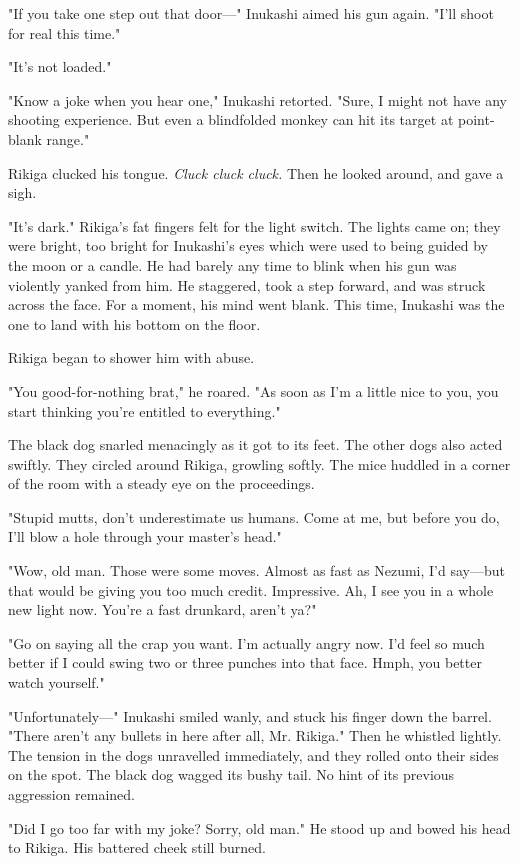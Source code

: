 "If you take one step out that door---" Inukashi aimed his gun again.
"I'll shoot for real this time."

"It's not loaded."

"Know a joke when you hear one," Inukashi retorted. "Sure, I might not
have any shooting experience. But even a blindfolded monkey can hit its
target at point-blank range."

Rikiga clucked his tongue. \emph{Cluck cluck cluck.} Then he looked around, and
gave a sigh.

"It's dark." Rikiga's fat fingers felt for the light switch. The lights
came on; they were bright, too bright for Inukashi's eyes which were
used to being guided by the moon or a candle. He had barely any time to
blink when his gun was violently yanked from him. He staggered, took a
step forward, and was struck across the face. For a moment, his mind
went blank. This time, Inukashi was the one to land with his bottom on
the floor.

Rikiga began to shower him with abuse.

"You good-for-nothing brat," he roared. "As soon as I'm a little nice to
you, you start thinking you're entitled to everything."

The black dog snarled menacingly as it got to its feet. The other dogs
also acted swiftly. They circled around Rikiga, growling softly. The
mice huddled in a corner of the room with a steady eye on the
proceedings.

"Stupid mutts, don't underestimate us humans. Come at me, but before you
do, I'll blow a hole through your master's head."

"Wow, old man. Those were some moves. Almost as fast as Nezumi, I'd
say---but that would be giving you too much credit. Impressive. Ah, I see
you in a whole new light now. You're a fast drunkard, aren't ya?"

"Go on saying all the crap you want. I'm actually angry now. I'd feel so
much better if I could swing two or three punches into that face. Hmph,
you better watch yourself."

"Unfortunately---" Inukashi smiled wanly, and stuck his finger down the
barrel. "There aren't any bullets in here after all, Mr. Rikiga." Then
he whistled lightly. The tension in the dogs unravelled immediately, and
they rolled onto their sides on the spot. The black dog wagged its bushy
tail. No hint of its previous aggression remained.

"Did I go too far with my joke? Sorry, old man." He stood up and bowed
his head to Rikiga. His battered cheek still burned.

